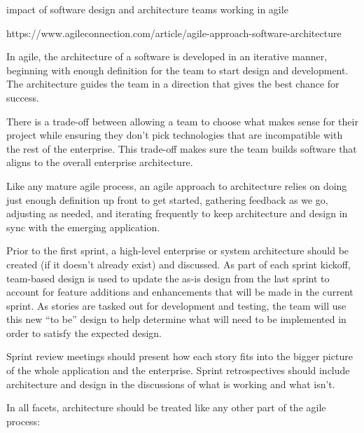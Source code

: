 impact of software design and architecture teams working in agile

https://www.agileconnection.com/article/agile-approach-software-architecture


In agile, the architecture of a software is developed in an iterative manner, beginning with enough definition for the team to start design and development. The architecture guides the team in a direction that gives the best chance for success.

There is a trade-off between allowing a team to choose what makes sense for their project while ensuring they don’t pick technologies that are incompatible with the rest of the enterprise. This trade-off makes sure the team builds software that aligns to the overall enterprise architecture.

Like any mature agile process, an agile approach to architecture relies on doing just enough definition up front to get started, gathering feedback as we go, adjusting as needed, and iterating frequently to keep architecture and design in sync with the emerging application.

Prior to the first sprint, a high-level enterprise or system architecture should be created (if it doesn’t already exist) and discussed. As part of each sprint kickoff, team-based design is used to update the as-is design from the last sprint to account for feature additions and enhancements that will be made in the current sprint. As stories are tasked out for development and testing, the team will use this new “to be” design to help determine what will need to be implemented in order to satisfy the expected design.

Sprint review meetings should present how each story fits into the bigger picture of the whole application and the enterprise. Sprint retrospectives should include architecture and design in the discussions of what is working and what isn’t.

In all facets, architecture should be treated like any other part of the agile process:

